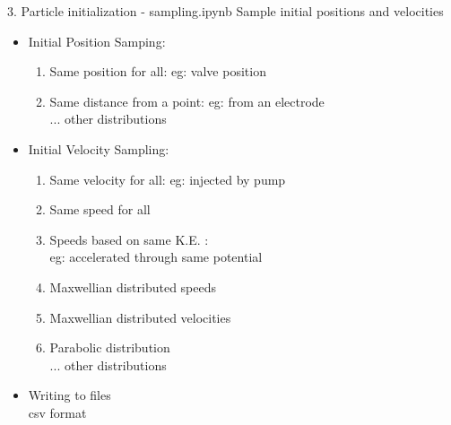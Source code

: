 \documentclass{beamer}
\begin{document}
	\begin{frame}[t]{3. Particle initialization - sampling.ipynb}
		Sample initial positions and velocities \\
		\begin{itemize}
			\item Initial Position Samping:
			\begin{enumerate}
				\item Same position for all: eg: valve position
				\item Same distance from a point: eg: from an electrode \\
				... other distributions
			\end{enumerate}
			\item Initial Velocity Sampling:
			\begin{enumerate}
				\item Same velocity for all: eg: injected by pump
				\item Same speed for all
				\item Speeds based on same K.E. : \\ eg: accelerated through same potential
				\item Maxwellian distributed speeds
				\item Maxwellian distributed velocities
				\item Parabolic distribution \\
				... other distributions
				
			\end{enumerate}
			
			\item Writing to files \\
			\hspace{0.5cm}csv format 
		\end{itemize}
		
	\end{frame}

	\begin{frame}
		
	\end{frame}
	\begin{frame}
		
	\end{frame}
	\begin{frame}
		
	\end{frame}
\end{document}
